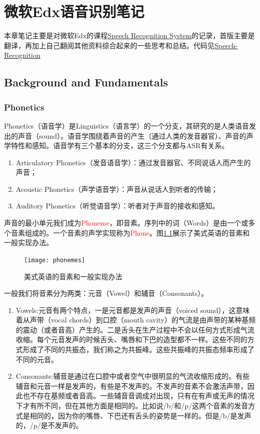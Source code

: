 \chapter{微软Edx语音识别笔记}
本章笔记主要是对微软Edx的课程\href{https://courses.edx.org/courses/course-v1:Microsoft+DEV287x+1T2019a/course/}{Speech Recognition System}的记录，首版主要是翻译，再加上自己翻阅其他资料综合起来的一些思考和总结。代码见\href{https://github.com/MicrosoftLearning/Speech-Recognition}{Speech-Recognition}

\section{Background and Fundamentals}
\subsection{Phonetics} %
\label{ssub:phonetics}
Phonetics（语音学）是Linguistics（语言学）的一个分支，其研究的是人类语音发出的声音（sound）。语音学围绕着声音的产生（通过人类的发音器官）、声音的声学特性和感知。语音学有三个基本的分支，这三个分支都与ASR有关系。
\begin{enumerate}
	\item Articulatory Phonetics（发音语音学）：通过发音器官、不同说话人而产生的声音；
	\item Acoustic Phonetics（声学语音学）：声音从说话人到听者的传输；
	\item Auditory Phonetics（听觉语音学）：听者对于声音的接收和感知。
\end{enumerate}

声音的最小单元我们成为\textcolor{red}{Phoneme}，即音素。序列中的词（Words）是由一个或多个音素组成的。一个音素的声学实现称为\textcolor{red}{Phone}。图\ref{fig:exam-phonemes}展示了美式英语的音素和一般实现办法。
\begin{figure}[htbp]
  \centering
  \texttt{[image: phonemes]}
  \caption{美式英语的音素和一般实现办法 \label{fig:exam-phonemes}}
\end{figure}

一般我们将音素分为两类：元音（Vowel）和辅音（Consonants）。
\begin{enumerate}
	\item Vowels:元音有两个特点，一是元音都是发声的声音（voiced sound），这意味着从声带（vocal chords）到口腔（mouth cavity）的气流是由声带的某种基频的震动（或者音高）产生的。二是舌头在生产过程中不会以任何方式形成气流收缩。每个元音发声的时候舌头、嘴唇和下巴的造型都不一样。这些不同的方式形成了不同的共振态，我们称之为共振峰。这些共振峰的共振态频率形成了不同的元音。
	\item Consonants:辅音是通过在口腔中或者空气中很明显的气流收缩形成的。有些辅音和元音一样是发声的，有些是不发声的。不发声的音素不会激活声带，因此也不存在基频或者音高。一些辅音音调成对出现，只有在有声或无声的情况下才有所不同，但在其他方面是相同的。比如说/b/和/p/这两个音素的发音方式是相同的，因为你的嘴唇、下巴还有舌头的姿势是一样的。但是/b/是发声的，/p/是不发声的。
\end{enumerate}

